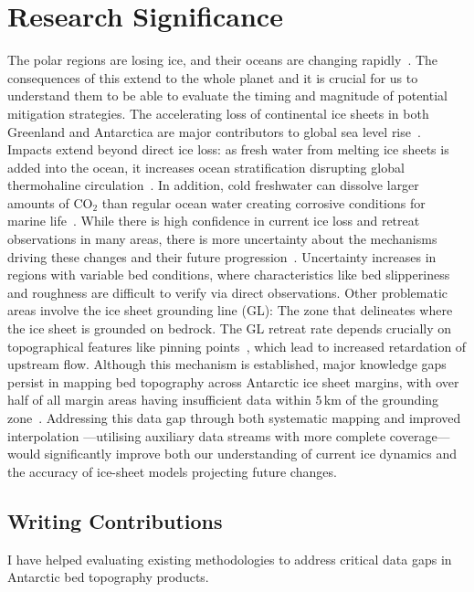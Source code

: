 \chapter{Research Significance}
The polar regions are losing ice, and their oceans are changing rapidly~\cite{O_C_in_changingClimate}. The consequences of this extend to the whole planet and it is crucial for us to understand them to be able to evaluate the timing and magnitude of potential mitigation strategies. 
The accelerating loss of continental ice sheets in both Greenland and Antarctica are major contributors to global sea level rise~\cite{O_C_in_changingClimate}. Impacts extend beyond direct ice loss: as fresh water from melting ice sheets is added into the ocean, it increases ocean stratification disrupting global thermohaline circulation~\cite{Jacobs_2004}. In addition, cold freshwater can dissolve larger amounts of $\mathrm{CO_2}$ than regular ocean water creating corrosive conditions for marine life~\cite{O_C_in_changingClimate}.
While there is high confidence in current ice loss and retreat observations in many areas, there is more uncertainty about the mechanisms driving these changes and their future progression~\cite{Fox-Kemper_2021}. Uncertainty increases in regions with variable bed conditions, where characteristics like bed slipperiness and roughness are difficult to verify via direct observations. Other problematic areas involve the ice sheet grounding line (GL): The zone that delineates where the ice sheet is grounded on bedrock. The GL retreat rate depends crucially on topographical features like pinning points~\cite{Fox-Kemper_2021}, which lead to increased retardation of upstream flow. Although this mechanism is established, major knowledge gaps persist in mapping bed topography across Antarctic ice sheet margins, with over half of all margin areas having insufficient data within $5\!\,$km of the grounding zone~\cite{RINGS_2022}. Addressing this data gap through both systematic mapping and improved interpolation —utilising auxiliary data streams with more complete coverage— would significantly improve both our understanding of current ice dynamics and the accuracy of ice-sheet models projecting future changes.

\section{Writing Contributions}
I have helped evaluating existing methodologies to address critical data gaps in Antarctic bed topography products. 

